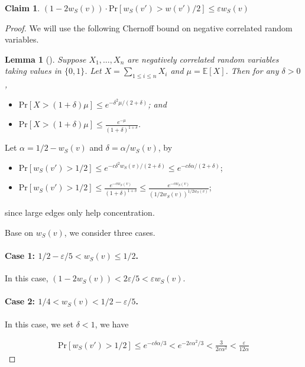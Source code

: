 \documentclass[11pt]{article}
\newtheorem{lemma}[theorem]{Lemma}
\theoremstyle{definition}
\newtheorem{claim}[theorem]{Claim}
\newcommand{\eps}{{\varepsilon}}
\def\pr#1{\mathrm{Pr}\left[ #1 \right]}
\def\ex#1{{\mathbb{E}}\left[ #1 \right]}
\begin{document}
\begin{claim}
$(1-2w_S(v)) \cdot \pr{w_S(v')>w(v')/2} \le \eps w_S(v)$
\end{claim}
\begin{proof}
We will use the following Chernoff bound on negative correlated random variables.

    \begin{lemma} [\cite{dubhashi1996balls}] \label{chernoff}
	Suppose $X_1,\dots,X_n$ are negatively correlated random variables taking values in $\{0,1\}$. Let $X=\sum_{1\le  i\le n}X_i$ and $\mu=\ex{X}$. Then for any $\delta>0$,
	\begin{itemize}
		\item $\pr{X > (1+\delta)\mu} \le e^{-\delta^2 \mu / (2+\delta)}$; and
		\item $\pr{X > (1+\delta)\mu} \le \frac{e^{-\mu}}{(1+\delta)^{1+\delta}}$.
	\end{itemize}
\end{lemma}
Let $\alpha = 1/2 - w_S(v)$ and $\delta = \alpha/w_S(v)$, by 

\begin{itemize}
    \item $\pr{w_S(v') > 1/2} \le e^{-c \delta^2 w_S(v) / (2+\delta)} \le e^{-c \delta \alpha / (2+\delta)}$;
    \item $\pr{w_S(v') > 1/2} \le \frac{e^{-c w_S(v)}}{(1+\delta)^{1+\delta}} \le \frac{e^{-c w_S(v)}}{(1/2w_S(v))^{1/2w_S(v)}}$;
\end{itemize}

since large edges only help concentration.

Base on $w_S(v)$, we consider three cases. 

\paragraph{Case 1: $1/2 - \eps/5 < w_S(v) \le 1/2$.} In this case, $(1-2w_S(v))<2\eps/5<\eps w_S(v)$.

\paragraph{Case 2: $1/4 < w_S(v) < 1/2 - \eps/5$.} In this case, we set $\delta < 1$, we have 

\begin{align*}
    \pr{w_S(v') > 1/2} \le e^{-c \delta \alpha / 3} < e^{- 2 c \alpha^2 / 3} < \frac{3}{2 c \alpha^2} < \frac{\eps}{12\alpha}
\end{align*}


\end{proof}
\end{document}
